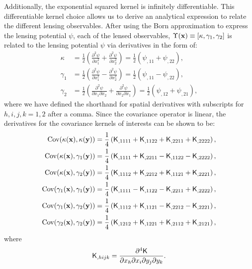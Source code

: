 Additionally, the exponential squared kernel is infinitely differentiable. This
differentiable kernel choice allows us to derive an analytical expression to
relate the different lensing observables.  
After using the Born approximation to express the lensing potential $\psi$,
each of the lensed observables, $\Upsilon(\mathbf{x}) \equiv [\kappa, \gamma_1,
\gamma_2]$ is related to the lensing potential $\psi$ via derivatives in the form of:
\begin{align}
\kappa &= \frac{1}{2}\left(\frac{\partial^2 \psi}{\partial x_1^2} +
\frac{\partial^2 \psi}{\partial x_2^2 }\right) 
= \frac{1}{2} (\psi_{,11} + \psi_{,22}),\\ 
\gamma_1 
&=\frac{1}{2}\left(\frac{\partial^2 \psi}{\partial x_1^2} - 
\frac{\partial^2 \psi}{\partial x_2^2}\right) 
= \frac{1}{2} (\psi_{,11} - \psi_{,22}), \\
\gamma_2 
&=\frac{1}{2}\left(\frac{\partial^2 \psi}{\partial x_1 \partial
x_2} + \frac{\partial^2 \psi}{\partial x_2 \partial x_1}\right)
= \frac{1}{2} (\psi_{,12} + \psi_{,21}), 
\end{align}
where we have defined the shorthand for spatial derivatives with
subscripts for $h,i,j,k = 1, 2$ after a comma.
Since the covariance operator is linear,
the derivatives for the covariance kernels of interests can be shown to be:
\begin{align}
	\label{eq:kernel_derivatives1}
	\mathrm{Cov} (\kappa(\mathbf{x}), \kappa(\mathbf{y}))
&= \frac{1}{4}\left(
\mathsf{K}_{,1111} + \mathsf{K}_{,1122} + \mathsf{K}_{,2211} + \mathsf{K}_{,2222}
\right), \\
\mathrm{Cov}(\kappa(\mathbf{x}), \gamma_1(\mathbf{y})) &= \frac{1}{4}\left(
\mathsf{K}_{,1111} + \mathsf{K}_{,2211} - \mathsf{K}_{,1122} - \mathsf{K}_{,2222}
\right), \\
\mathrm{Cov}(\kappa(\mathbf{x}), \gamma_2(\mathbf{y})) &= \frac{1}{4}\left(
\mathsf{K}_{,1112} + \mathsf{K}_{,2212} + \mathsf{K}_{,1121} + \mathsf{K}_{,2221}
\right),\\
\mathrm{Cov}(\gamma_1(\mathbf{x}), \gamma_1(\mathbf{y})) &= \frac{1}{4}\left(
\mathsf{K}_{,1111} - \mathsf{K}_{,1122} - \mathsf{K}_{,2211} + \mathsf{K}_{,2222}
\right), \\
\mathrm{Cov}(\gamma_1(\mathbf{x}), \gamma_2(\mathbf{y})) &= \frac{1}{4}\left(
\mathsf{K}_{,1112} + \mathsf{K}_{,1121} - \mathsf{K}_{,2212} - \mathsf{K}_{,2221}
\right), \\
\mathrm{Cov}(\gamma_2(\mathbf{x}), \gamma_2(\mathbf{y})) &= \frac{1}{4}\left(
\mathsf{K}_{,1212} + \mathsf{K}_{,1221} + \mathsf{K}_{,2112} + \mathsf{K}_{,2121}
\right),
\end{align}
where
\begin{equation}
	\mathsf{K}_{,hijk} = \frac{\partial^4 \mathsf{K}}{\partial x_h \partial x_i
	\partial y_j \partial y_k}.
\end{equation}


